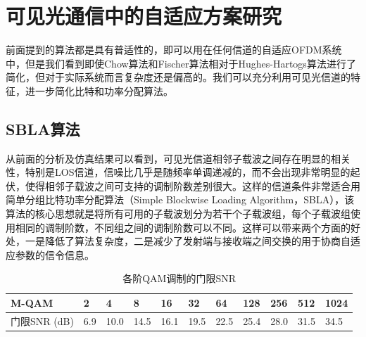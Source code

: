 \section{可见光通信中的自适应方案研究}
前面提到的算法都是具有普适性的，即可以用在任何信道的自适应OFDM系统中，但是我们看到即使Chow算法和Fischer算法相对于Hughes-Hartogs算法进行了简化，但对于实际系统而言复杂度还是偏高的。我们可以充分利用可见光信道的特征，进一步简化比特和功率分配算法。
\subsection{SBLA算法}
从前面的分析及仿真结果可以看到，可见光信道相邻子载波之间存在明显的相关性，特别是LOS信道，信噪比几乎是随频率单调递减的，而不会出现非常明显的起伏，使得相邻子载波之间可支持的调制阶数差别很大。这样的信道条件非常适合用简单分组比特功率分配算法（Simple Blockwise Loading Algorithm，SBLA）\cite{grunheid2000adaptive}，该算法的核心思想就是将所有可用的子载波划分为若干个子载波组，每个子载波组使用相同的调制阶数，不同组之间的调制阶数可以不同。这样可以带来两个方面的好处，一是降低了算法复杂度，二是减少了发射端与接收端之间交换的用于协商自适应参数的信令信息。
\begin{table}[ht]
    \caption{各阶QAM调制的门限SNR}
    \label{tab:thresholdSNR}
    \centering
    \begin{tabular}{lllllllllll}
        \toprule
        M-QAM      & 2 &4 &8  &16  &32 &64 &128 &256 &512 &1024 \\
        \midrule
        门限SNR (dB) & 6.9& 10.0&14.5 &16.1 &19.5&22.5&25.4&28.0&31.5&34.5   \\
        \bottomrule
    \end{tabular}
\end{table}

